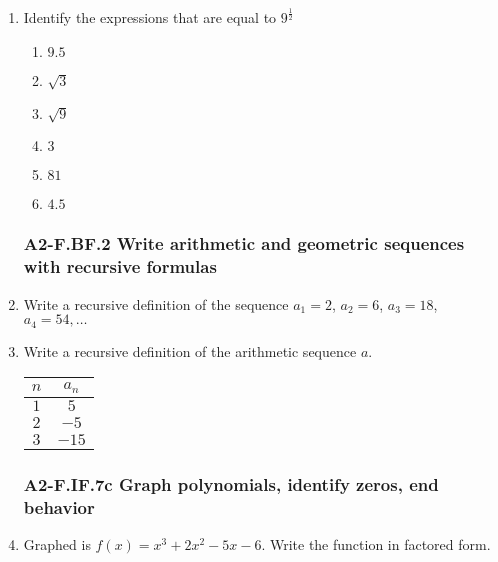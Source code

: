\documentclass[12pt, twoside]{article}
\begin{document}
\begin{enumerate}[itemsep=0.5cm]
\item Identify the expressions that are equal to $\displaystyle 9^{\frac{1}{2}}$
    \begin{multicols}{2}
    \begin{enumerate}
        \item $9.5$
        \item $\sqrt{3}$
        \item $\sqrt{9}$
        \item $3$
        \item $81$
        \item $4.5$
    \end{enumerate}
    \end{multicols}
        
\newpage
\subsubsection*{A2-F.BF.2 Write arithmetic and geometric sequences with recursive formulas}
\item Write a recursive definition of the sequence $a_1 = 2$, $a_2 = 6$, $a_3 = 18$, $a_4 = 54, \ldots$ \vspace{2cm}

\item Write a recursive definition of the arithmetic sequence $a$. \\[0.5cm]
\renewcommand{\arraystretch}{1.5}
\begin{tabular}{|c|c|}
\hline
$n$ & $a_n$ \\
\hline
$1$ & $5$ \\
$2$ & $-5$ \\
$3$ & $-15$ \\
\hline
\end{tabular} \vspace{1cm}

\newpage 
\subsubsection*{A2-F.IF.7c Graph polynomials, identify zeros, end behavior}

\item Graphed is $f(x) = x^3+2x^2-5x-6$. Write the function in factored form. 
    \begin{flushright}
    \end{flushright}


\end{enumerate}
\end{document}
